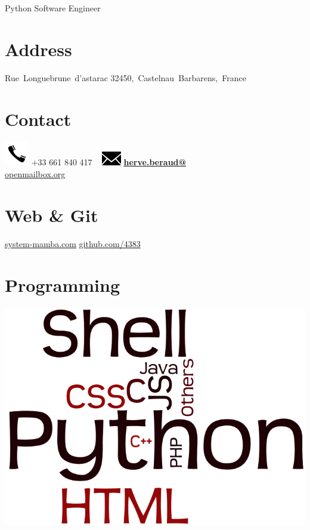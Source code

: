 \documentclass[]{friggeri-cv}
\begin{document}
      {Python Software Engineer}
      

\begin{aside}
  \section{Address}
    Rue~Longuebrune~d'astarac
    32450,~Castelnau~Barbarens,~France
    ~
  \section{Contact}
    \includegraphics[scale=0.50]{img/phone.png}
    +33 661 840 417
    ~
    \includegraphics[scale=0.50]{img/mail.png}
    \href{mailto:herve.beraud@openmailbox.org}{\textbf{herve.beraud@}\\openmailbox.org}
    ~
  \section{Web \& Git}
    \href{http://www.system-mamba.ovh}{system-mamba.com}
    \href{https://github.com/4383}{github.com/4383}
    ~
  \section{Programming}
    \includegraphics[scale=0.15]{img/programming.png}
    ~

\end{aside}
\end{document}
